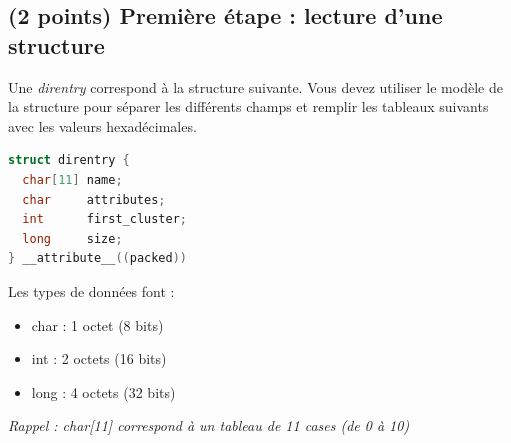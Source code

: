 \documentclass[11pt,a4paper]{article}
\begin{document}
\medskip

\subsection{(2 points) Première étape : lecture d'une structure }

\noindent Une \textit{direntry} correspond à la structure suivante.
Vous devez utiliser le modèle de la structure pour séparer les différents champs et remplir les tableaux suivants avec les valeurs hexadécimales.

\begin{table}[ht!]
  \centering
  \begin{minipage}{0.45\textwidth}
    \centering
\begin{lstlisting}[language=C]
struct direntry {
  char[11] name;
  char     attributes;
  int      first_cluster;
  long     size;
} __attribute__((packed)) \end{lstlisting}
  \end{minipage}
  \hfillx
  \begin{minipage}{0.45\textwidth}
Les types de données font :

\begin{itemize}
\item char : 1 octet (8 bits)
\item int : 2 octets (16 bits)
\item long : 4 octets (32 bits)
\end{itemize}

\textit{Rappel : char[11] correspond à un tableau de 11 cases (de 0 à 10)}
  \end{minipage}
\end{table}


\clearpage
\end{document}

